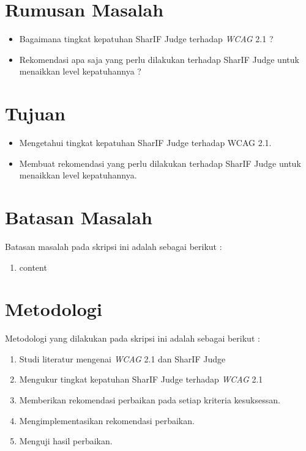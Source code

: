 \section{Rumusan Masalah}
\label{sec:rumusan}
\begin{itemize}
	\item Bagaimana tingkat kepatuhan SharIF Judge terhadap \textit{WCAG} 2.1 ?
	\item Rekomendasi apa saja yang perlu dilakukan terhadap SharIF Judge untuk menaikkan level kepatuhannya ?
\end{itemize}

\section{Tujuan}
\label{sec:tujuan}
\begin{itemize}
	\item Mengetahui tingkat kepatuhan SharIF Judge terhadap WCAG 2.1.
	\item Membuat rekomendasi yang perlu dilakukan terhadap SharIF Judge untuk menaikkan level kepatuhannya.
\end{itemize} 

\section{Batasan Masalah}
\label{sec:batasan}
Batasan masalah pada skripsi ini adalah sebagai berikut :

\begin{enumerate}
	\item content
\end{enumerate}

\section{Metodologi}
\label{sec:metlit}
Metodologi yang dilakukan pada skripsi ini adalah sebagai berikut :

\begin{enumerate}
	\item Studi literatur mengenai \textit{WCAG} 2.1 dan SharIF Judge
	\item Mengukur tingkat kepatuhan SharIF Judge terhadap \textit{WCAG} 2.1
	\item Memberikan rekomendasi perbaikan pada setiap kriteria kesuksessan.
	\item Mengimplementasikan rekomendasi perbaikan.
	\item Menguji hasil perbaikan.
\end{enumerate}

